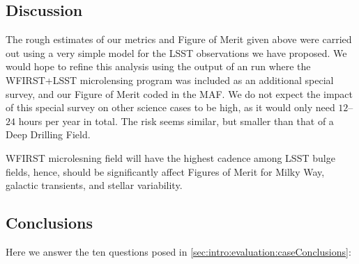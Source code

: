 %
%
%
%

\subsection{Discussion}
\label{sec:\secname:discussion}

The rough estimates of our metrics and Figure of Merit given above were
carried out using a very simple model for the LSST observations we
have proposed. We would hope to refine this analysis using the output
of an \OpSim run where the WFIRST+LSST microlensing program was included
as an additional special survey, and our Figure of Merit coded in the
MAF. We do not expect the impact of this special survey on other science cases
to be high, as it would only need $12$--$24$ hours per year in total. The risk
seems similar, but smaller than that of a Deep Drilling Field.

WFIRST microlesning field will have the highest cadence among LSST bulge fields,
hence, should be significantly affect Figures of Merit for Milky Way,
galactic transients, and stellar variability.



\subsection{Conclusions}

Here we answer the ten questions posed in
\autoref{sec:intro:evaluation:caseConclusions}:


